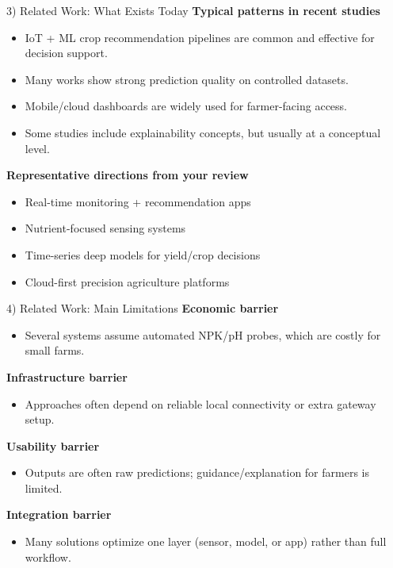 \documentclass[aspectratio=169]{beamer}
\begin{document}
\begin{frame}{3) Related Work: What Exists Today}
  \textbf{Typical patterns in recent studies}
  \begin{itemize}
    \item IoT + ML crop recommendation pipelines are common and effective for decision support.
    \item Many works show strong prediction quality on controlled datasets.
    \item Mobile/cloud dashboards are widely used for farmer-facing access.
    \item Some studies include explainability concepts, but usually at a conceptual level.
  \end{itemize}
  \vspace{0.5em}
  \textbf{Representative directions from your review}
  \begin{itemize}
    \item Real-time monitoring + recommendation apps
    \item Nutrient-focused sensing systems
    \item Time-series deep models for yield/crop decisions
    \item Cloud-first precision agriculture platforms
  \end{itemize}
\end{frame}

\begin{frame}{4) Related Work: Main Limitations}
  \textbf{Economic barrier}
  \begin{itemize}
    \item Several systems assume automated NPK/pH probes, which are costly for small farms.
  \end{itemize}
  \textbf{Infrastructure barrier}
  \begin{itemize}
    \item Approaches often depend on reliable local connectivity or extra gateway setup.
  \end{itemize}
  \textbf{Usability barrier}
  \begin{itemize}
    \item Outputs are often raw predictions; guidance/explanation for farmers is limited.
  \end{itemize}
  \textbf{Integration barrier}
  \begin{itemize}
    \item Many solutions optimize one layer (sensor, model, or app) rather than full workflow.
  \end{itemize}
\end{frame}
\end{document}
